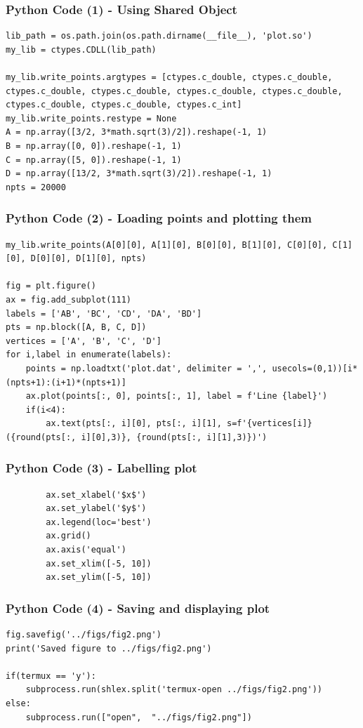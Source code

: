 \documentclass{beamer}
\begin{document}
\begin{frame}[fragile]
    \frametitle{Python Code (1) - Using Shared Object}
    \begin{lstlisting}
lib_path = os.path.join(os.path.dirname(__file__), 'plot.so')
my_lib = ctypes.CDLL(lib_path)

my_lib.write_points.argtypes = [ctypes.c_double, ctypes.c_double, ctypes.c_double, ctypes.c_double, ctypes.c_double, ctypes.c_double, ctypes.c_double, ctypes.c_double, ctypes.c_int]
my_lib.write_points.restype = None
A = np.array([3/2, 3*math.sqrt(3)/2]).reshape(-1, 1)
B = np.array([0, 0]).reshape(-1, 1)
C = np.array([5, 0]).reshape(-1, 1)
D = np.array([13/2, 3*math.sqrt(3)/2]).reshape(-1, 1)
npts = 20000
\end{lstlisting}
\end{frame}

\begin{frame}[fragile]
    \frametitle{Python Code (2) - Loading points and plotting them}
    \begin{lstlisting}
my_lib.write_points(A[0][0], A[1][0], B[0][0], B[1][0], C[0][0], C[1][0], D[0][0], D[1][0], npts)

fig = plt.figure()
ax = fig.add_subplot(111)
labels = ['AB', 'BC', 'CD', 'DA', 'BD']
pts = np.block([A, B, C, D])
vertices = ['A', 'B', 'C', 'D']
for i,label in enumerate(labels):
    points = np.loadtxt('plot.dat', delimiter = ',', usecols=(0,1))[i*(npts+1):(i+1)*(npts+1)]
    ax.plot(points[:, 0], points[:, 1], label = f'Line {label}')
    if(i<4):
        ax.text(pts[:, i][0], pts[:, i][1], s=f'{vertices[i]}({round(pts[:, i][0],3)}, {round(pts[:, i][1],3)})')
\end{lstlisting}
\end{frame}

\begin{frame}[fragile]
    \frametitle{Python Code (3) - Labelling plot}
    \begin{lstlisting}
        ax.set_xlabel('$x$')
        ax.set_ylabel('$y$')
        ax.legend(loc='best')
        ax.grid() 
        ax.axis('equal')
        ax.set_xlim([-5, 10])
        ax.set_ylim([-5, 10])
    \end{lstlisting}
\end{frame}

\begin{frame}[fragile]
    \frametitle{Python Code (4) - Saving and displaying plot}
    \begin{lstlisting}
fig.savefig('../figs/fig2.png')
print('Saved figure to ../figs/fig2.png')

if(termux == 'y'):
    subprocess.run(shlex.split('termux-open ../figs/fig2.png'))
else:
    subprocess.run(["open",  "../figs/fig2.png"])
\end{lstlisting}
\end{frame}
\end{document}
